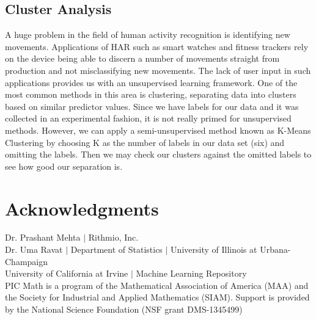 \documentclass[12pt]{article}
\begin{document}
\subsection{Cluster Analysis}
A huge problem in the field of human activity recognition is identifying new movements. Applications of HAR such as smart watches and fitness trackers rely on the device being able to discern a number of movements straight from production and not misclassifying new movements. The lack of user input in such applications provides us with an unsupervised learning framework. One of the most common methods in this area is clustering, separating data into clusters based on similar predictor values. Since we have labels for our data and it was collected in an experimental fashion, it is not really primed for unsupervised methods. However, we can apply a semi-unsupervised method known as K-Means Clustering by choosing K as the number of labels in our data set (six) and omitting the labels. Then we may check our clusters against the omitted labels to see how good our separation is.

\section*{Acknowledgments}
\noindent
Dr. Prashant Mehta $|$ Rithmio, Inc.\\
\noindent
Dr. Uma Ravat $|$ Department of Statistics $|$ University of Illinois at Urbana-Champaign \\
\noindent
University of California at Irvine $|$ Machine Learning Repository\\
\noindent
PIC Math is a program of the Mathematical Association of America (MAA) and the Society for Industrial and Applied Mathematics (SIAM).  
Support is provided by the National Science Foundation (NSF grant DMS-1345499)
















\clearpage
\end{document}
